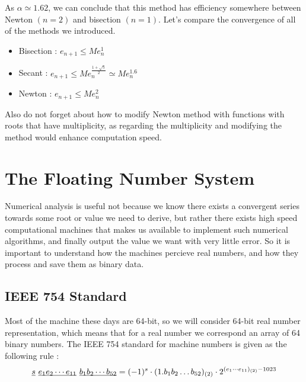 \documentclass[paper=a4, fontsize=11pt]{scrartcl}
\begin{document}
As $\alpha \simeq 1.62$, we can conclude that this method has efficiency somewhere between Newton $(n=2)$ and bisection $(n=1)$. Let's compare the convergence of all of the methods we introduced.\\

\begin{itemize}
	\item Bisection : $e_{n+1} \leq M e_n^1$ 
	\item Secant :  $e_{n+1} \leq M e_n^\frac{1+\sqrt{5}}{2} \simeq M e_n^{1.6} $ 
	\item Newton : $e_{n+1} \leq M e_n^2$ \\
\end{itemize}

Also do not forget about how to modify Newton method with functions with roots that have multiplicity, as regarding the multiplicity and modifying the method would enhance computation speed.

\vspace{0.25in}

\section{The Floating Number System}
\vspace{0.25in}

Numerical analysis is useful not because we know there exists a convergent series towards some root or value we need to derive, but rather there exists high speed computational machines that makes us available to implement such numerical algorithms, and finally output the value we want with very little error. So it is important to understand how the machines percieve real numbers, and how they process and save them as binary data.

\vspace{0.15in}

\subsection{IEEE 754 Standard}
\vspace{0.15in}

Most of the machine these days are 64-bit, so we will consider 64-bit real number representation, which means that for a real number we correspond an array of 64 binary numbers. The IEEE 754 standard for machine numbers is given as the following rule :\\

\begin{equation}\nonumber
	\underbar{$s$} \text{ } \underbar{$e_1 e_2 \cdots e_{11} $} \text{ }  \underbar{$b_1 b_2 \cdots b_{52} $}  = (-1)^{s} \cdot (1.b_1 b_2 \dots b_{52})_{(2)} \cdot 2^{(e_1 \cdots e_{11})_{(2)}-1023}
\end{equation} \\
\end{document}
